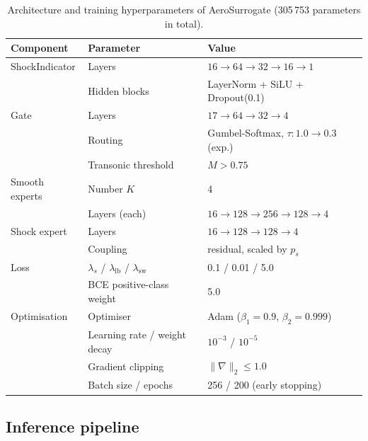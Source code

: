 \documentclass{WCCM-ECCOMAS_2026_Full_Paper}
\begin{document}
\begin{table}[ht]
\centering
\caption{Architecture and training hyperparameters of AeroSurrogate
  (305\,753 parameters in total).}
\label{tab:arch}
\begin{tabular}{lll}
\toprule
\textbf{Component} & \textbf{Parameter} & \textbf{Value} \\
\midrule
ShockIndicator & Layers & $16{\to}64{\to}32{\to}16{\to}1$ \\
               & Hidden blocks & LayerNorm + SiLU + Dropout(0.1) \\
\midrule
Gate           & Layers & $17{\to}64{\to}32{\to}4$ \\
               & Routing & Gumbel-Softmax, $\tau: 1.0 \to 0.3$ (exp.) \\
               & Transonic threshold & $M > 0.75$ \\
\midrule
Smooth experts & Number $K$ & 4 \\
               & Layers (each) & $16{\to}128{\to}256{\to}128{\to}4$ \\
\midrule
Shock expert   & Layers & $16{\to}128{\to}128{\to}4$ \\
               & Coupling & residual, scaled by $p_s$ \\
\midrule
Loss           & $\lambda_{s}$ / $\lambda_{\mathrm{lb}}$ / $\lambda_{\mathrm{sw}}$ & 0.1 / 0.01 / 5.0 \\
               & BCE positive-class weight & 5.0 \\
\midrule
Optimisation   & Optimiser & Adam ($\beta_1{=}0.9$, $\beta_2{=}0.999$) \\
               & Learning rate / weight decay & $10^{-3}$ / $10^{-5}$ \\
               & Gradient clipping & $\|\nabla\|_2 \le 1.0$ \\
               & Batch size / epochs & 256 / 200 (early stopping) \\
\bottomrule
\end{tabular}
\end{table}

\subsection{Inference pipeline}
\label{sec:inference}
\end{document}
